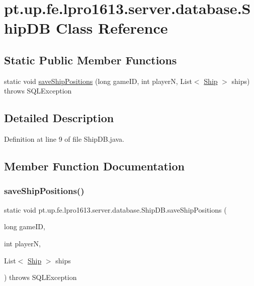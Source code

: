 \hypertarget{classpt_1_1up_1_1fe_1_1lpro1613_1_1server_1_1database_1_1_ship_d_b}{}\section{pt.\+up.\+fe.\+lpro1613.\+server.\+database.\+Ship\+DB Class Reference}
\label{classpt_1_1up_1_1fe_1_1lpro1613_1_1server_1_1database_1_1_ship_d_b}
\subsection*{Static Public Member Functions}
\begin{DoxyCompactItemize}
\item 
static void \hyperlink{classpt_1_1up_1_1fe_1_1lpro1613_1_1server_1_1database_1_1_ship_d_b_a1b7c2d5d84b479078cbb9b1de9445ae9}{save\+Ship\+Positions} (long game\+ID, int playerN, List$<$ \hyperlink{classpt_1_1up_1_1fe_1_1lpro1613_1_1server_1_1logic_1_1game_1_1_ship}{Ship} $>$ ships)  throws S\+Q\+L\+Exception 
\end{DoxyCompactItemize}


\subsection{Detailed Description}


Definition at line 9 of file Ship\+D\+B.\+java.



\subsection{Member Function Documentation}
\hypertarget{classpt_1_1up_1_1fe_1_1lpro1613_1_1server_1_1database_1_1_ship_d_b_a1b7c2d5d84b479078cbb9b1de9445ae9}{}\label{classpt_1_1up_1_1fe_1_1lpro1613_1_1server_1_1database_1_1_ship_d_b_a1b7c2d5d84b479078cbb9b1de9445ae9} 
\subsubsection{\texorpdfstring{save\+Ship\+Positions()}{saveShipPositions()}}
{\footnotesize\ttfamily static void pt.\+up.\+fe.\+lpro1613.\+server.\+database.\+Ship\+D\+B.\+save\+Ship\+Positions (\begin{DoxyParamCaption}\item[{long}]{game\+ID,  }\item[{int}]{playerN,  }\item[{List$<$ \hyperlink{classpt_1_1up_1_1fe_1_1lpro1613_1_1server_1_1logic_1_1game_1_1_ship}{Ship} $>$}]{ships }\end{DoxyParamCaption}) throws S\+Q\+L\+Exception\hspace{0.3cm}{\ttfamily [static]}}



